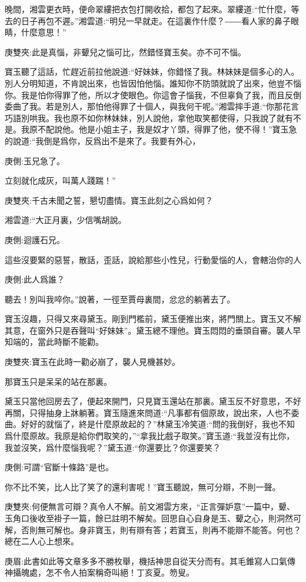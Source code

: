 \begin{parag}
    晚間，湘雲更衣時，便命翠縷把衣包打開收拾，都包了起來。翠縷道:“忙什麼，等去的日子再包不遲。”湘雲道:“明兒一早就走。在這裏作什麼？――看人家的鼻子眼睛，什麼意思！”\begin{note}庚雙夾:此是真惱，非顰兒之惱可比，然錯怪寶玉矣。亦不可不惱。\end{note}寶玉聽了這話，忙趕近前拉他說道:“好妹妹，你錯怪了我。林妹妹是個多心的人。別人分明知道，不肯說出來，也皆因怕他惱。誰知你不防頭就說了出來，他豈不惱你。我是怕你得罪了他，所以才使眼色。你這會子惱我，不但辜負了我，而且反倒委曲了我。若是別人，那怕他得罪了十個人，與我何干呢。”湘雲摔手道:“你那花言巧語別哄我。我也原不如你林妹妹，別人說他，拿他取笑都使得，只我說了就有不是。我原不配說他。他是小姐主子，我是奴才丫頭，得罪了他，使不得！”寶玉急的說道:“我倒是爲你，反爲出不是來了。我要有外心，\begin{note}庚側:玉兄急了。\end{note}立刻就化成灰，叫萬人踐踹！”\begin{note}庚雙夾:千古未聞之誓，懇切盡情。寶玉此刻之心爲如何？\end{note}湘雲道:“大正月裏，少信嘴胡說。\begin{note}庚側:迴護石兄。\end{note}這些沒要緊的惡誓，散話，歪話，說給那些小性兒，行動愛惱的人，會轄治你的人\begin{note}庚側:此人爲誰？\end{note}聽去！別叫我啐你。”說著，一徑至賈母裏間，忿忿的躺著去了。
\end{parag}


\begin{parag}
    寶玉沒趣，只得又來尋黛玉。剛到門檻前，黛玉便推出來，將門關上。寶玉又不解其意，在窗外只是吞聲叫“好妹妹”。黛玉總不理他。寶玉悶悶的垂頭自審。襲人早知端的，當此時斷不能勸。\begin{note}庚雙夾:寶玉在此時一勸必崩了，襲人見機甚妙。\end{note}那寶玉只是呆呆的站在那裏。
\end{parag}


\begin{parag}
    黛玉只當他回房去了，便起來開門，只見寶玉還站在那裏。黛玉反不好意思，不好再關，只得抽身上牀躺著。寶玉隨進來問道:“凡事都有個原故，說出來，人也不委曲。好好的就惱了，終是什麼原故起的？”林黛玉冷笑道:“問的我倒好，我也不知爲什麼原故。我原是給你們取笑的，”“拿我比戲子取笑。”寶玉道:“我並沒有比你，我並沒笑，爲什麼惱我呢？”黛玉道:“你還要比？你還要笑？\begin{note}庚側:可謂“官斷十條路”是也。\end{note}你不比不笑，比人比了笑了的還利害呢！”寶玉聽說，無可分辯，不則一聲。\begin{note}庚雙夾:何便無言可辯？真令人不解。前文湘雲方來，“正言彈妒意”一篇中，顰、玉角口後收至褂子一篇，餘已註明不解矣。回思自心自身是玉、顰之心，則洞然可解，否則無可解也。身非寶玉，則有辯有答；若寶玉，則再不能辯不能答。何也？總在二人心上想來。\end{note}\begin{note}庚眉:此書如此等文章多多不勝枚舉，機括神思自從天分而有。其毛錐寫人口氣傳神攝魄處，怎不令人拍案稱奇叫絕！丁亥夏。笏叟。\end{note}
\end{parag}


